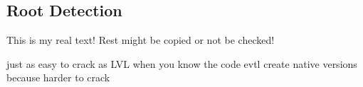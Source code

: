 \subsection{Root Detection}\label{subsection:evaluation-tampering-root}
This is my real text! Rest might be copied or not be checked!

just as easy to crack as LVL when you know the code\newline
evtl create native versions because harder to crack\newline
